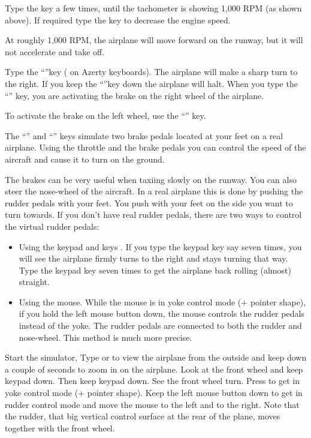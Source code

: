 \begin{itemize}
Type the  key a few times,
until the tachometer is showing 1,000 RPM (as shown above). If required
type the  key to decrease the engine speed.

At roughly 1,000 RPM, the airplane will move forward on the runway, but it will
not accelerate and take off.

 Type the ``''key ( on
Azerty keyboards). The airplane will make a sharp turn to the right. If you
keep the ``''key down the airplane will halt. When you type the
``'' key, you are activating the brake on the right wheel of the
airplane.

 To activate the brake on the left
wheel, use the ``\key{,}'' key.

 The ``\key{,}'' and ``''  keys simulate two brake pedals
located at your feet on a real airplane. Using the throttle and the brake pedals
you can control the speed of the aircraft and cause it to turn on the ground.

The brakes can be very useful when taxiing slowly on the runway. You can also
steer the nose-wheel of the aircraft. In a real airplane this is done by pushing
the rudder pedals with your feet. You push with your feet on the side you want
to turn towards. If you don't have real rudder pedals, there are two ways to
control the virtual rudder pedals:
\begin{itemize}
    \item Using the keypad   and  keys
  . If you type the keypad  key say
  seven times, you will see the airplane firmly turns to the right and
  stays turning that way. Type the keypad  key seven times to get the
  airplane back rolling (almost) straight.
    \item Using the mouse. While the mouse is in yoke control mode
  ($+$ pointer shape), if you hold the left mouse button down, the mouse
  controls the rudder pedals instead of the yoke. The rudder pedals are
  connected to both the rudder 
   and nose-wheel. This method is much more precise.
\end{itemize}

Start the simulator, Type  or  to view the airplane from
the outside and keep  down a couple of seconds to zoom in on the
airplane. Look at the front wheel and keep keypad  down. Then
keep keypad  down. See the front wheel turn. Press 
to get in yoke control mode ($+$ pointer shape).
Keep the left mouse button down to get in rudder control mode and move
the mouse to the left and to the right. Note that the rudder, that big
vertical control surface at the rear of the plane, moves together with
the front wheel.


\end{itemize}
